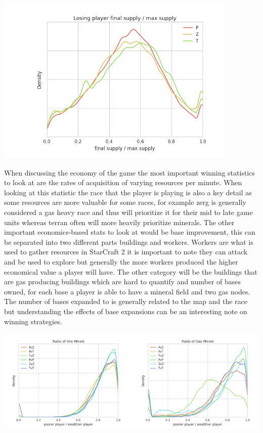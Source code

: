 \documentclass[a4paper,12pt]{report}
\begin{document}
\begin{center}
    \captionsetup{type=figure}
    \includegraphics[width=.7\linewidth]{media/SupplyGraph.png}
\end{center}

When discussing the economy of the game the most important winning statistics to look at are the rates of acquisition of varying resources per minute. When looking at this statistic the race that the player is playing is also a key detail as some resources are more valuable for some races, for example zerg is generally considered a gas heavy race and thus will prioritize it for their mid to late game units whereas terran often will more heavily prioritize minerals. The other important economics-based stats to look at would be base improvement, this can be separated into two different parts buildings and workers. Workers are what is used to gather resources in StarCraft 2 it is important to note they can attack and be used to explore but generally the more workers produced the higher economical value a player will have. The other category will be the buildings that are gas producing buildings which are hard to quantify and number of bases owned, for each base a player is able to have a mineral field and two gas nodes. The number of bases expanded to is generally related to the map and the race but understanding the effects of base expansions can be an interesting note on winning strategies.

\begin{center}
    \captionsetup{type=figure}
    \includegraphics[width=.9\linewidth]{media/ratiogasoremined.png}
\end{center}
\end{document}
